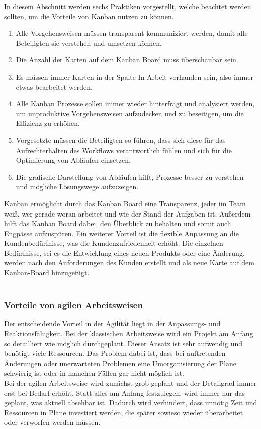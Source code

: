 \documentclass[ngerman]{seminarvorlage}
\begin{document}
In diesem Abschnitt werden sechs Praktiken vorgestellt, welche beachtet werden sollten, um die Vorteile von Kanban nutzen zu können.\cite{Refa.}
\begin{enumerate}
\item Alle Vorgehensweisen müssen transparent kommuniziert werden, damit alle Beteiligten sie verstehen und umsetzen können.
\item Die Anzahl der Karten auf dem Kanban Board muss überschaubar sein.
\item Es müssen immer Karten in der Spalte \glqq In Arbeit\grqq\: vorhanden sein, also immer etwas bearbeitet werden.
\item Alle Kanban Prozesse sollen immer wieder hinterfragt und analysiert werden, um unproduktive Vorgehensweisen aufzudecken und zu beseitigen, um die Effizienz zu erhöhen.
\item Vorgesetzte müssen die Beteiligten so führen, dass sich diese für das Aufrechterhalten des Workflows verantwortlich fühlen und sich für die Optimierung von Abläufen einsetzen.
\item Die grafische Darstellung von Abläufen hilft, Prozesse besser zu verstehen und mögliche Lösungswege aufzuzeigen.
\end{enumerate}

Kanban ermöglicht durch das Kanban Board eine Transparenz, jeder im Team weiß, wer gerade woran arbeitet und wie der Stand der Aufgaben ist. Außerdem hilft das Kanban Board dabei, den Überblick zu behalten und somit auch Engpässe aufzuspüren. Ein weiterer Vorteil ist die flexible Anpassung an die Kundenbedürfnisse, was die Kundenzufriedenheit erhöht. Die einzelnen Bedürfnisse, sei es die Entwicklung eines neuen Produkts oder eine Änderung, werden nach den Anforderungen des Kunden erstellt und als neue Karte auf dem Kanban-Board hinzugefügt.\\\\
\subsubsection{Vorteile von agilen Arbeitsweisen}
Der entscheidende Vorteil in der Agilität liegt in der Anpassungs- und Reaktionsfähigkeit. Bei der klassischen Arbeitsweise wird ein Projekt am Anfang so detailliert wie möglich durchgeplant. Dieser Ansatz ist sehr aufwendig und benötigt viele Ressourcen. Das Problem dabei ist, dass bei auftretenden Änderungen oder unerwarteten Problemen eine Umorganisierung der Pläne schwierig ist oder in manchen Fällen gar nicht möglich ist.\\
Bei der agilen Arbeitsweise wird zunächst grob geplant und der Detailgrad immer erst bei Bedarf erhöht. Statt alles am Anfang festzulegen, wird immer nur das geplant, was aktuell absehbar ist. Dadurch wird verhindert, dass unnötig Zeit und Ressourcen in Pläne investiert werden, die später sowieso wieder überarbeitet oder verworfen werden müssen.\cite{Theobald.2021}
\end{document}
